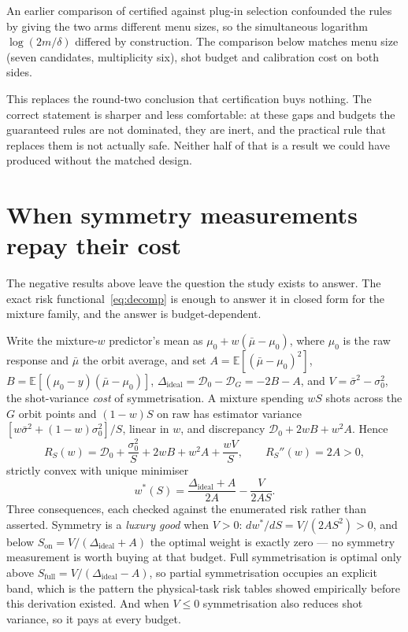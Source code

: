 \documentclass{article}
\newcommand{\risk}{R}
\begin{document}
An earlier comparison of certified against plug-in selection confounded the rules by giving the two arms
different menu sizes, so the simultaneous logarithm $\log(2m/\delta)$ differed by construction. The
comparison below matches menu size (seven candidates, multiplicity six), shot budget and calibration
cost on both sides.




This replaces the round-two conclusion that certification buys nothing. The correct statement is
sharper and less comfortable: at these gaps and budgets the guaranteed rules are not dominated, they are
inert, and the practical rule that replaces them is not actually safe. Neither half of that is a result
we could have produced without the matched design.

\section{When symmetry measurements repay their cost}
\label{sec:repay}

The negative results above leave the question the study exists to answer. The exact risk
functional~\eqref{eq:decomp} is enough to answer it in closed form for the mixture family, and the
answer is budget-dependent.

Write the mixture-$w$ predictor's mean as $\mu_0 + w(\bar\mu - \mu_0)$, where $\mu_0$ is the raw
response and $\bar\mu$ the orbit average, and set
$A=\mathbb{E}[(\bar\mu-\mu_0)^2]$, $B=\mathbb{E}[(\mu_0-y)(\bar\mu-\mu_0)]$,
$\Delta_{\mathrm{ideal}}=\mathcal{D}_0-\mathcal{D}_G=-2B-A$, and $V=\bar\sigma^2-\sigma_0^2$, the
shot-variance \emph{cost} of symmetrisation. A mixture spending $wS$ shots across the $G$ orbit points
and $(1-w)S$ on raw has estimator variance $[w\bar\sigma^2+(1-w)\sigma_0^2]/S$, linear in $w$, and
discrepancy $\mathcal{D}_0+2wB+w^2A$. Hence
\begin{equation}
\risk_S(w)=\mathcal{D}_0+\frac{\sigma_0^2}{S}+2wB+w^2A+\frac{wV}{S},
\qquad \risk_S''(w)=2A>0,
\end{equation}
strictly convex with unique minimiser
\begin{equation}
w^\ast(S)=\frac{\Delta_{\mathrm{ideal}}+A}{2A}-\frac{V}{2AS}.
\label{eq:wstar}
\end{equation}
Three consequences, each checked against the enumerated risk rather than asserted. Symmetry is a
\emph{luxury good} when $V>0$: $dw^\ast/dS=V/(2AS^2)>0$, and below $S_{\mathrm{on}}=V/(\Delta_{
\mathrm{ideal}}+A)$ the optimal weight is exactly zero --- no symmetry measurement is worth buying at
that budget. Full symmetrisation is optimal only above $S_{\mathrm{full}}=V/(\Delta_{\mathrm{ideal}}-A)$,
so partial symmetrisation occupies an explicit band, which is the pattern the physical-task risk tables
showed empirically before this derivation existed. And when $V\le0$ symmetrisation also reduces shot
variance, so it pays at every budget.
\end{document}
